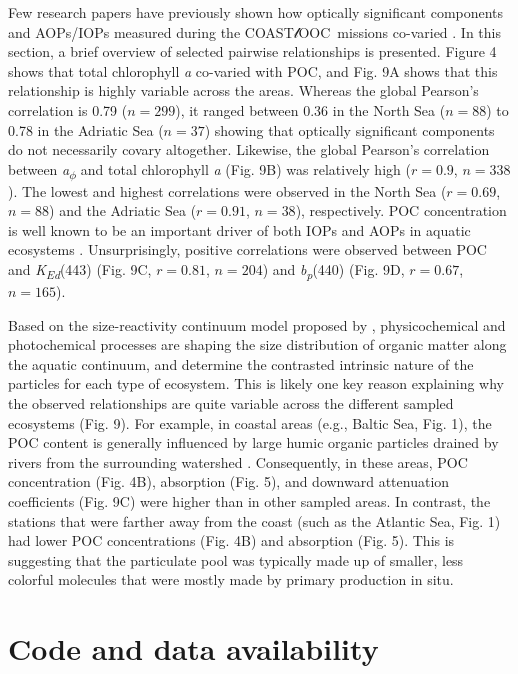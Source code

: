 \documentclass[essd, manuscript]{copernicus}
\newcommand{\coastlooc}{COAST$\mathscr{l}$OOC~\allowbreak}
\begin{document}
Few research papers have previously shown how optically significant components and AOPs/IOPs measured during the \coastlooc missions co-varied \citep{Ferrari2000, Ferrari2003, Babin2003b, Babin2003a}. In this section, a brief overview of selected pairwise relationships is presented. Figure 4 shows that total chlorophyll \textit{a} co-varied with POC, and Fig. 9A shows that this relationship is highly variable across the areas. Whereas the global Pearson's correlation is 0.79 ($n = 299$), it ranged between 0.36 in the North Sea ($n = 88$) to 0.78 in the Adriatic Sea ($n = 37$) showing that optically significant components do not necessarily covary altogether. Likewise, the global Pearson's correlation between \textit{a\textsubscript{$\phi$}} and total chlorophyll \textit{a} (Fig. 9B) was relatively high ($r = 0.9$, $n = 338$). The lowest and highest correlations were observed in the North Sea ($r = 0.69$, $n = 88$) and the Adriatic Sea ($r = 0.91$, $n = 38$), respectively. POC concentration is well known to be an important driver of both IOPs and AOPs in aquatic ecosystems \citep{Stramski2008, Cetinic2012a}. Unsurprisingly, positive correlations were observed between POC and \textit{K\textsubscript{Ed}}(443) (Fig. 9C, $r = 0.81$, $n = 204$) and \textit{b\textsubscript{p}}(440) (Fig. 9D, $r = 0.67$, $n = 165$). 

Based on the size-reactivity continuum model proposed by \citealt{Benner2015}, physicochemical and photochemical processes are shaping the size distribution of organic matter along the aquatic continuum, and determine the contrasted intrinsic nature of the particles for each type of ecosystem. This is likely one key reason explaining why the observed relationships are quite variable across the different sampled ecosystems (Fig. 9). For example, in coastal areas (e.g., Baltic Sea, Fig. 1), the POC content is generally influenced by large humic organic particles drained by rivers from the surrounding watershed \citep{Babin2003a}. Consequently, in these areas, POC concentration (Fig. 4B), absorption (Fig. 5), and downward attenuation coefficients (Fig. 9C) were higher than in other sampled areas. In contrast, the stations that were farther away from the coast (such as the Atlantic Sea, Fig. 1) had lower POC concentrations (Fig. 4B) and absorption (Fig. 5). This is suggesting that the particulate pool was typically made up of smaller, less colorful molecules that were mostly made by primary production in situ.

\section{Code and data availability}
\end{document}
